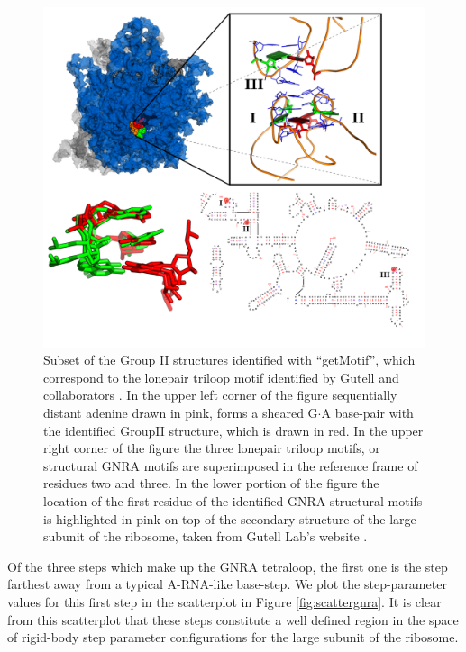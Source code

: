 \begin{figure}
\centering 
\includegraphics[angle=0, scale=0.34]{Chapter5/lonepairtlooptertF.png}
\caption{Subset   of   the  Group   II   structures  identified   with
  ``getMotif'',  which  correspond   to  the  lonepair  triloop  motif
  identified by Gutell and collaborators \cite{lee2003}.  In the upper
  left  corner of  the figure  sequentially distant  adenine  drawn in
  pink,  forms  a  sheared  G$\cdot$A base-pair  with  the  identified
  GroupII structure, which is drawn in red.  In the upper right corner
  of the figure the three  lonepair triloop motifs, or structural GNRA
  motifs are superimposed  in the reference frame of  residues two and
  three. In the lower portion of  the figure the location of the first
  residue of  the identified GNRA structural motifs  is highlighted in
  pink on top  of the secondary structure of the  large subunit of the
  ribosome, taken from Gutell Lab's website \cite{cannone2002}.  }
\label{fig:terts}
\end{figure}

Of the three steps which make  up the GNRA tetraloop, the first one is
the step farthest  away from a typical A-RNA-like  base-step.  We plot
the step-parameter  values for this  first step in the  scatterplot in
Figure \ref{fig:scattergnra}.  It is clear from  this scatterplot that
these  steps  constitute  a  well  defined  region  in  the  space  of
rigid-body step parameter configurations  for the large subunit of the
ribosome.

